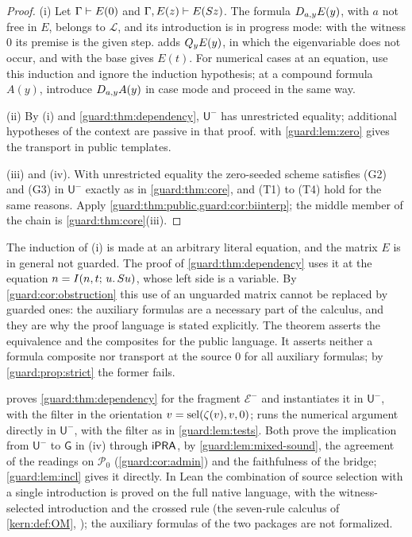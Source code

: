\begin{proof}
(i) Let $\Gamma\vdash E(0)$ and $\Gamma,E(z)\vdash E(S z)$.  The
formula $D_{a,y}E(y)$, with $a$ not free in $E$, belongs to $\mathcal L$,
and its introduction is in progress mode: with the witness $0$ its premise
is the given step.   adds $Q_{y}E(y)$, in which the
eigenvariable does not occur, and  with the base gives $E(t)$.
For numerical cases at an equation, use this induction and ignore the
induction hypothesis; at a compound formula $A(y)$, introduce
$D_{a,y}A(y)$ in case mode and proceed in the same way.

(ii) By (i) and \cref{guard:thm:dependency}, $\mathsf U^{-}$ has
unrestricted equality; additional hypotheses of the context are passive in
that proof.   with \cref{guard:lem:zero} gives the
transport in public templates.

(iii) and (iv).  With unrestricted equality the zero-seeded scheme
satisfies (G2) and (G3) in $\mathsf U^{-}$ exactly as in
\cref{guard:thm:core}, and (T1) to (T4) hold for the same reasons.  Apply
\cref{guard:thm:public,guard:cor:biinterp}; the middle member of the chain
is \cref{guard:thm:core}(iii).
\end{proof}

The induction of (i) is made at an arbitrary literal equation, and the
matrix $E$ is in general not guarded.  The proof of
\cref{guard:thm:dependency} uses it at the equation
$n=I(n,t;\,u.\,S u)$, whose left side is a variable.  By
\cref{guard:cor:obstruction} this use of an unguarded matrix cannot be
replaced by guarded ones: the auxiliary formulas are a necessary part of the
calculus, and they are why the proof language is stated explicitly.  The
theorem asserts the equivalence and the composites for the public language.
It asserts neither a formula composite nor transport at the source $0$ for
all auxiliary formulas; by \cref{guard:prop:strict} the former fails.

\begin{remark}[Versions]
\label{guard:rem:aux-versions}
 proves \cref{guard:thm:dependency} for the fragment
$\mathcal E^{-}$ and instantiates it in $\mathsf U^{-}$, with the filter in
the orientation $v=\operatorname{sel}(\zeta(v),v,0)$;  runs
the numerical argument directly in $\mathsf U^{-}$, with the filter as in
\cref{guard:lem:tests}.  Both prove the implication from $\mathsf U^{-}$ to
$\mathsf G$ in (iv) through $\mathsf{iPRA}$, by \cref{guard:lem:mixed-sound}, the
agreement of the readings on $\mathcal P_0$ (\cref{guard:cor:admin}) and the
faithfulness of the bridge; \cref{guard:lem:incl} gives it directly.  In
Lean the combination of source selection with a single introduction is
proved on the full native language, with the witness-selected introduction
and the crossed rule (the seven-rule calculus of \cref{kern:def:OM},
); the auxiliary formulas of the
two packages are not formalized.
\end{remark}

